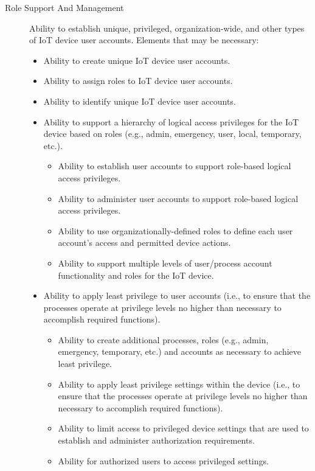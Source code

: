 \begin{description}
    
    \item[Role Support And Management] Ability to establish unique, privileged, organization-wide, and other types of IoT device user accounts. Elements that may be necessary:
    \begin{itemize}
        \item Ability to create unique IoT device user accounts.
        \item Ability to assign roles to IoT device user accounts.
        \item Ability to identify unique IoT device user accounts.
        \item Ability to support a hierarchy of logical access privileges for the IoT device based on roles (e.g., admin, emergency, user, local, temporary, etc.).
        \begin{itemize}
            \item Ability to establish user accounts to support role-based logical access privileges.
            \item Ability to administer user accounts to support role-based logical access privileges.
            \item Ability to use organizationally-defined roles to define each user account’s access and permitted device actions.
            \item Ability to support multiple levels of user/process account functionality and roles for the IoT device.
        \end{itemize}
        \item Ability to apply least privilege to user accounts (i.e., to ensure that the processes operate at privilege levels no higher than necessary to accomplish required functions).
        \begin{itemize}
            \item Ability to create additional processes, roles (e.g., admin, emergency, temporary, etc.) and accounts as necessary to achieve least privilege.
            \item Ability to apply least privilege settings within the device (i.e., to ensure that the processes operate at privilege levels no higher than necessary to accomplish required functions).
            \item Ability to limit access to privileged device settings that are used to establish and administer authorization requirements.
            \item Ability for authorized users to access privileged settings.
        \end{itemize}

\end{itemize}
\end{description}
